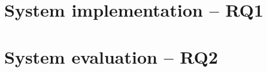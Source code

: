 

\section{System implementation -- RQ1}
  \label{sec:sys_impl}
  

\section{System evaluation -- RQ2}
  \label{sec:sys_eval}
  